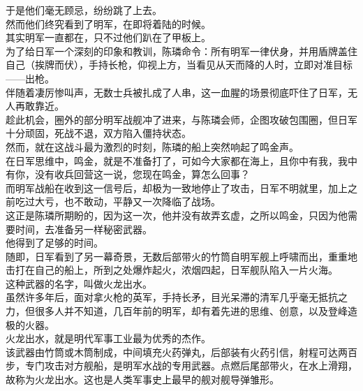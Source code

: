 \begin{multicols}{\theparacolNo}
于是他们毫无顾忌，纷纷跳了上去。\\

然而他们终究看到了明军，在即将着陆的时候。\\

其实明军一直都在，只不过他们趴在了甲板上。\\

为了给日军一个深刻的印象和教训，陈璘命令：所有明军一律伏身，并用盾牌盖住自己（挨牌而伏），手持长枪，仰视上方，当看见从天而降的人时，立即对准目标——出枪。\\

伴随着凄厉惨叫声，无数士兵被扎成了人串，这一血腥的场景彻底吓住了日军，无人再敢靠近。\\

趁此机会，圈外的部分明军战舰冲了进来，与陈璘会师，企图攻破包围圈，但日军十分顽固，死战不退，双方陷入僵持状态。\\

然而，就在这战斗最为激烈的时刻，陈璘的船上突然响起了鸣金声。\\

在日军思维中，鸣金，就是不准备打了，可如今大家都在海上，且你中有我，我中有你，没有收兵回营这一说，您现在鸣金，算怎么回事？\\

而明军战船在收到这一信号后，却极为一致地停止了攻击，日军不明就里，加上之前吃过大亏，也不敢动，平静又一次降临了战场。\\

这正是陈璘所期盼的，因为这一次，他并没有故弄玄虚，之所以鸣金，只因为他需要时间，去准备另一样秘密武器。\\

他得到了足够的时间。\\

随即，日军看到了另一幕奇景，无数后部带火的竹筒自明军舰上呼啸而出，重重地击打在自己的船上，所到之处爆炸起火，浓烟四起，日军舰队陷入一片火海。\\

这种武器的名字，叫做火龙出水。\\

虽然许多年后，面对拿火枪的英军，手持长矛，目光呆滞的清军几乎毫无抵抗之力，但很多人并不知道，几百年前的明军，却有着先进的思维、创意，以及登峰造极的火器。\\

火龙出水，就是明代军事工业最为优秀的杰作。\\

该武器由竹筒或木筒制成，中间填充火药弹丸，后部装有火药引信，射程可达两百步，专门攻击对方舰船，是明军水战的专用武器。点燃后尾部带火，在水上滑翔，故称为火龙出水。这也是人类军事史上最早的舰对舰导弹雏形。\\


\end{multicols}
